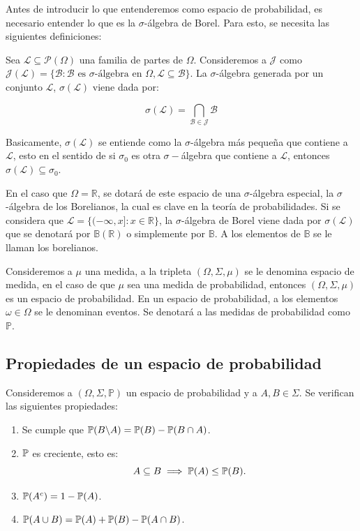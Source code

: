 Antes de introducir lo que entenderemos como espacio de probabilidad, es necesario entender lo que es la $\sigma$-álgebra de Borel. Para esto, se necesita las siguientes definiciones:

\begin{definition}
Sea $\mathcal{L}\subseteq\mathcal{P}(\Omega)$ una familia de partes de $\Omega$. Consideremos a $\mathcal{J}$ como $\mathcal{J}(\mathcal{L})=\{\mathcal{B}:\mathcal{B}\text{ es $\sigma$-álgebra en }\Omega, \mathcal{L}\subseteq\mathcal{B}\}$. La $\sigma$-álgebra generada por un conjunto $\mathcal{L}$, $\sigma(\mathcal{L})$ viene dada por:

\[\sigma(\mathcal{L})=\bigcap\limits_{\mathcal{B}\in\mathcal{J}}\mathcal{B}\]
\end{definition}

 Basicamente, $\sigma(\mathcal{L})$ se entiende como la $\sigma$-álgebra más pequeña que contiene a $\mathcal{L}$, esto en el sentido de si $\sigma_0$ es otra $\sigma-$álgebra que contiene a $\mathcal{L}$, entonces $\sigma(\mathcal{L})\subseteq\sigma_0$. 

En el caso que $\Omega=\mathbb{R}$, se dotará de este espacio de una $\sigma$-álgebra especial, la $\sigma$-álgebra de los Borelianos, la cual es clave en la teoría de probabilidades. Si se considera que $\mathcal{L}=\{(-\infty, x]:x\in\mathbb{\mathbb{R}}\}$, la $\sigma$-álgebra de Borel viene dada por $\sigma(\mathcal{L})$ que se denotará por $\mathbb{B}(\mathbb{R})$ o simplemente por $\mathbb{B}$. A los elementos de $\mathbb{B}$ se le llaman los borelianos.

Consideremos a $\mu$ una medida, a la tripleta $(\Omega, \Sigma, \mu)$ se le denomina espacio de medida, en el caso de que $\mu$ sea una medida de probabilidad, entonces $(\Omega, \Sigma, \mu)$ es un espacio de probabilidad. En un espacio de probabilidad, a los elementos $\omega\in\Omega$ se le denominan eventos. Se denotará a las medidas de probabilidad como $\mathbb{P}$.  

\subsection{Propiedades de un espacio de probabilidad}

Consideremos a $(\Omega, \Sigma, \mathbb{P})$ un espacio de probabilidad y a $A,B\in\Sigma$. Se verifican las siguientes propiedades:

\begin{enumerate}
    \item Se cumple que $\mathbb{P} (B\backslash A)=\mathbb{P} (B)-\mathbb{P} (B\cap A)$.
    \item $\mathbb{P}$ es creciente, esto es:
    \[A\subseteq B \implies \mathbb{P} (A)\leq \mathbb{P} (B).\]
    \item $\mathbb{P} (A^c)=1-\mathbb{P}(A)$.
    \item $\mathbb{P}(A\cup B)=\mathbb{P}(A)+\mathbb{P}(B)-\mathbb{P}(A\cap B)$.
\end{enumerate}

